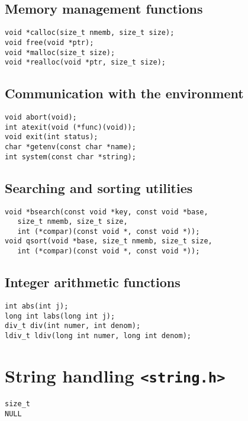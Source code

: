 \documentclass[a4paper,11pt,draft]{article}
\begin{document}
\subsection*{Memory management functions}

\begin{verbatim}
void *calloc(size_t nmemb, size_t size);
void free(void *ptr);
void *malloc(size_t size);
void *realloc(void *ptr, size_t size);
\end{verbatim}

\subsection*{Communication with the environment}

\begin{verbatim}
void abort(void);
int atexit(void (*func)(void));
void exit(int status);
char *getenv(const char *name);
int system(const char *string);
\end{verbatim}

\subsection*{Searching and sorting utilities}

\begin{verbatim}
void *bsearch(const void *key, const void *base,
   size_t nmemb, size_t size,
   int (*compar)(const void *, const void *));
void qsort(void *base, size_t nmemb, size_t size,
   int (*compar)(const void *, const void *));
\end{verbatim}

\subsection*{Integer arithmetic functions}

\begin{verbatim}
int abs(int j);
long int labs(long int j);
div_t div(int numer, int denom);
ldiv_t ldiv(long int numer, long int denom);
\end{verbatim}

\section*{String handling {\tt <string.h>}}

\begin{verbatim}
size_t
NULL
\end{verbatim}
\end{document}
